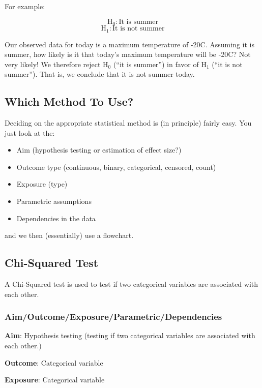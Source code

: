 \documentclass[12pt,]{article}
\providecommand{\tightlist}{%
  \setlength{\itemsep}{0pt}\setlength{\parskip}{0pt}}
\begin{document}
For example:

\[\text{H}_0: \text{It is summer}\]
\[\text{H}_1: \text{It is not summer}\]

Our observed data for today is a maximum temperature of -20C. Assuming
it is summer, how likely is it that today's maximum temperature will be
-20C? Not very likely! We therefore reject \(\text{H}_0\) (``it is
summer'') in favor of \(\text{H}_1\) (``it is not summer''). That is, we
conclude that it is not summer today.

\subsection{Which Method To Use?}\label{which-method-to-use}

Deciding on the appropriate statistical method is (in principle) fairly
easy. You just look at the:

\begin{itemize}
\tightlist
\item
  Aim (hypothesis testing or estimation of effect size?)
\item
  Outcome type (continuous, binary, categorical, censored, count)
\item
  Exposure (type)
\item
  Parametric assumptions
\item
  Dependencies in the data
\end{itemize}

and we then (essentially) use a flowchart.

\subsection{Chi-Squared Test}\label{chi-squared-test}

A Chi-Squared test is used to test if two categorical variables are
associated with each other.

\subsubsection{Aim/Outcome/Exposure/Parametric/Dependencies}\label{aimoutcomeexposureparametricdependencies}

\textbf{Aim}: Hypothesis testing (testing if two categorical variables
are associated with each other.)

\textbf{Outcome}: Categorical variable

\textbf{Exposure}: Categorical variable
\end{document}

